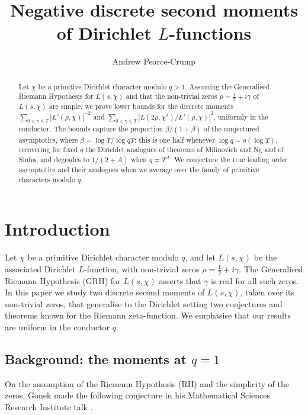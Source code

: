 \documentclass[12pt,a4paper,reqno]{amsart}
\theoremstyle{remark}
\numberwithin{equation}{section}
\begin{document}
\title[Negative discrete Dirichlet $L$-function moments]{Negative discrete second moments of Dirichlet $L$-functions}

\author[A. Pearce-Crump]{Andrew Pearce-Crump}
\address{School of Mathematics, University of Bristol, Bristol, BS8 1UG, United Kingdom}

\begin{abstract}
Let $\chi$ be a primitive Dirichlet character modulo $q>1$. Assuming the Generalised Riemann Hypothesis for $L(s,\chi)$ and that the non-trivial zeros $\rho=\tfrac12+i\gamma$ of $L(s,\chi)$ are simple, we prove lower bounds for the discrete moments $\sum_{0<\gamma\le T}|L'(\rho,\chi)|^{-2}$ and $\sum_{0<\gamma\le T}|L(2\rho,\chi^2)/L'(\rho,\chi)|^2$, uniformly in the conductor. The bounds capture the proportion $\beta/(1+\beta)$ of the conjectured asymptotics, where $\beta=\log T/\log qT$: this is one half whenever $\log q=o(\log T)$, recovering for fixed $q$ the Dirichlet analogues of theorems of Milinovich and Ng and of Sinha, and degrades to $1/(2+A)$ when $q=T^{A}$. We conjecture the true leading order asymptotics and their analogues when we average over the family of primitive characters modulo $q$.
\end{abstract}

\maketitle

\section{Introduction}\label{sect:intro}

Let $\chi$ be a primitive Dirichlet character modulo $q$, and let $L(s,\chi)$ be the associated Dirichlet $L$-function, with non-trivial zeros $\rho=\tfrac12+i\gamma$. The Generalised Riemann Hypothesis (GRH) for $L(s,\chi)$ asserts that $\gamma$ is real for all such zeros. In this paper we study two discrete second moments of $L(s,\chi)$, taken over its non-trivial zeros, that generalise to the Dirichlet setting two conjectures and theorems known for the Riemann zeta-function. We emphasise that our results are uniform in the conductor $q$.

\subsection{Background: the moments at $q=1$}
On the assumption of the Riemann Hypothesis (RH) and the simplicity of the zeros, Gonek made the following conjecture in his Mathematical Sciences Research Institute talk \cite{Gonek}.
\end{document}
